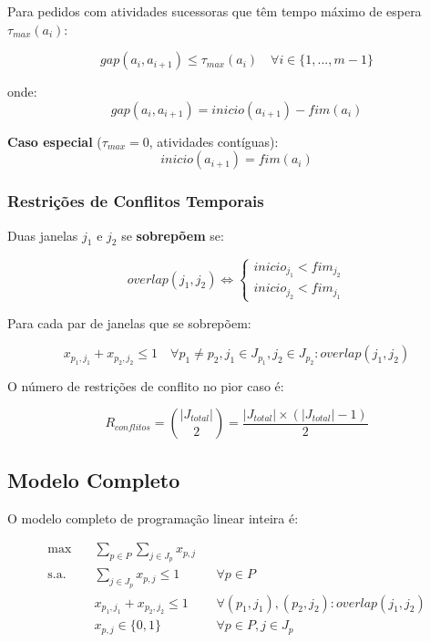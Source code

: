\documentclass[12pt,a4paper]{article}
\theoremstyle{definition}
\begin{document}
Para pedidos com atividades sucessoras que têm tempo máximo de espera $\tau_{max}(a_i)$:

\begin{equation}
gap(a_i, a_{i+1}) \leq \tau_{max}(a_i) \quad \forall i \in \{1, ..., m-1\}
\label{eq:gap}
\end{equation}

onde:
\begin{equation}
gap(a_i, a_{i+1}) = inicio(a_{i+1}) - fim(a_i)
\end{equation}

\textbf{Caso especial} ($\tau_{max} = 0$, atividades contíguas):
\begin{equation}
inicio(a_{i+1}) = fim(a_i)
\end{equation}

\subsubsection{Restrições de Conflitos Temporais}

Duas janelas $j_1$ e $j_2$ se \textbf{sobrepõem} se:

\begin{equation}
overlap(j_1, j_2) \iff \begin{cases}
inicio_{j_1} < fim_{j_2} \\
inicio_{j_2} < fim_{j_1}
\end{cases}
\label{eq:overlap}
\end{equation}

Para cada par de janelas que se sobrepõem:

\begin{equation}
x_{p_1,j_1} + x_{p_2,j_2} \leq 1 \quad \forall p_1 \neq p_2, j_1 \in J_{p_1}, j_2 \in J_{p_2} : overlap(j_1, j_2)
\label{eq:conflito}
\end{equation}

O número de restrições de conflito no pior caso é:

\begin{equation}
R_{conflitos} = \binom{|J_{total}|}{2} = \frac{|J_{total}| \times (|J_{total}| - 1)}{2}
\end{equation}

\subsection{Modelo Completo}

O modelo completo de programação linear inteira é:

\begin{equation}
\begin{aligned}
\max \quad & \sum_{p \in P} \sum_{j \in J_p} x_{p,j} \\
\text{s.a.} \quad & \sum_{j \in J_p} x_{p,j} \leq 1 && \forall p \in P \\
& x_{p_1,j_1} + x_{p_2,j_2} \leq 1 && \forall (p_1,j_1), (p_2,j_2) : overlap(j_1,j_2) \\
& x_{p,j} \in \{0, 1\} && \forall p \in P, j \in J_p
\end{aligned}
\label{eq:modelo_completo}
\end{equation}
\end{document}
